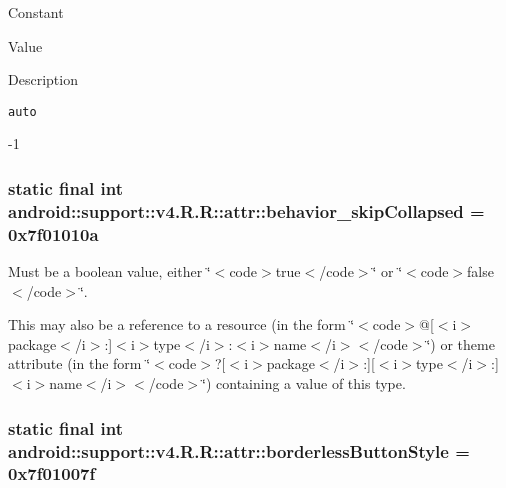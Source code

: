 Constant

Value

Description 

{\tt auto}

-1\hypertarget{classandroid_1_1support_1_1v4_1_1_r_1_1attr_5545df3de384583d10ba6222a0ad873b}{
\subsubsection[{behavior\_\-skipCollapsed}]{\setlength{\rightskip}{0pt plus 5cm}static final int android::support::v4.R.R::attr::behavior\_\-skipCollapsed = 0x7f01010a}}
\label{classandroid_1_1support_1_1v4_1_1_r_1_1attr_5545df3de384583d10ba6222a0ad873b}


Must be a boolean value, either \char`\"{}$<$code$>$true$<$/code$>$\char`\"{} or \char`\"{}$<$code$>$false$<$/code$>$\char`\"{}. 

This may also be a reference to a resource (in the form \char`\"{}$<$code$>$@\mbox{[}$<$i$>$package$<$/i$>$:\mbox{]}$<$i$>$type$<$/i$>$:$<$i$>$name$<$/i$>$$<$/code$>$\char`\"{}) or theme attribute (in the form \char`\"{}$<$code$>$?\mbox{[}$<$i$>$package$<$/i$>$:\mbox{]}\mbox{[}$<$i$>$type$<$/i$>$:\mbox{]}$<$i$>$name$<$/i$>$$<$/code$>$\char`\"{}) containing a value of this type. \hypertarget{classandroid_1_1support_1_1v4_1_1_r_1_1attr_096be99e2a43d9ce76a8a420c1dd3d68}{
\subsubsection[{borderlessButtonStyle}]{\setlength{\rightskip}{0pt plus 5cm}static final int android::support::v4.R.R::attr::borderlessButtonStyle = 0x7f01007f}}
\label{classandroid_1_1support_1_1v4_1_1_r_1_1attr_096be99e2a43d9ce76a8a420c1dd3d68}


